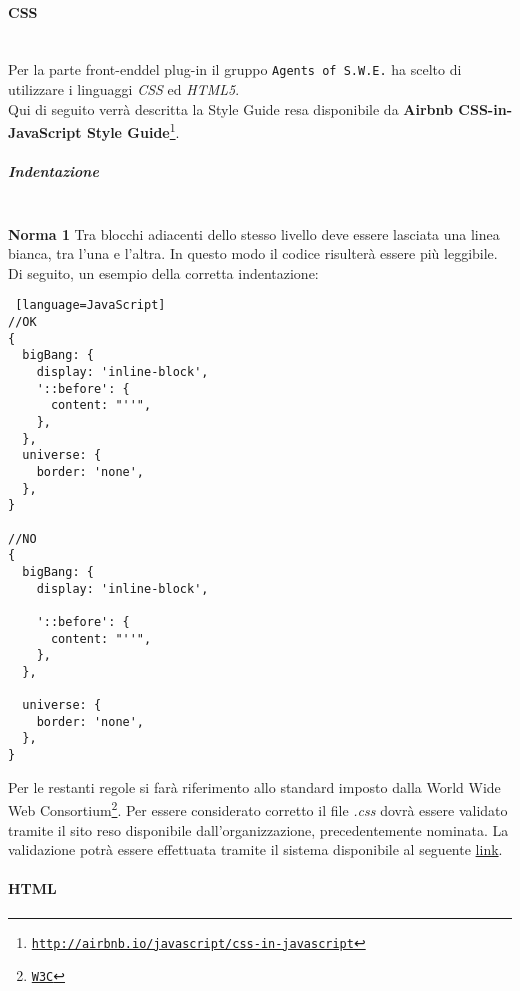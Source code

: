 \paragraph{CSS}
\label{css} \-\\

Per la parte front-end\glossario del plug-in il gruppo \texttt{Agents of S.W.E.} ha scelto di utilizzare i linguaggi \textit{CSS} ed \textit{HTML5}.\\
Qui di seguito verrà descritta la Style Guide resa disponibile da \textbf{Airbnb CSS-in-JavaScript Style Guide}\footnote{\texttt{\url{http://airbnb.io/javascript/css-in-javascript}}}.

\subparagraph{Indentazione} \-\\
\textbf{Norma 1}
Tra blocchi adiacenti dello stesso livello deve essere lasciata una linea bianca, tra l'una e l'altra. In questo modo il codice risulterà essere più leggibile. \\
Di seguito, un esempio della corretta indentazione: 


\begin{lstlisting} [language=JavaScript]
//OK
{
  bigBang: {
    display: 'inline-block',
    '::before': {
      content: "''",
    },
  },
  universe: {
    border: 'none',
  },
}

//NO
{
  bigBang: {
    display: 'inline-block',

    '::before': {
      content: "''",
    },
  },

  universe: {
    border: 'none',
  },
}
\end{lstlisting}

Per le restanti regole si farà riferimento allo standard imposto dalla World Wide Web Consortium\footnote{\href{http://www.w3.org/}{\texttt{W3C}}}. Per essere considerato corretto il file \textit{.css} dovrà essere validato tramite il sito reso disponibile dall'organizzazione, precedentemente nominata. La validazione potrà essere effettuata tramite il sistema disponibile al seguente \href{http://validator.w3.org/}{link}.

\paragraph{HTML}
\label{html}

